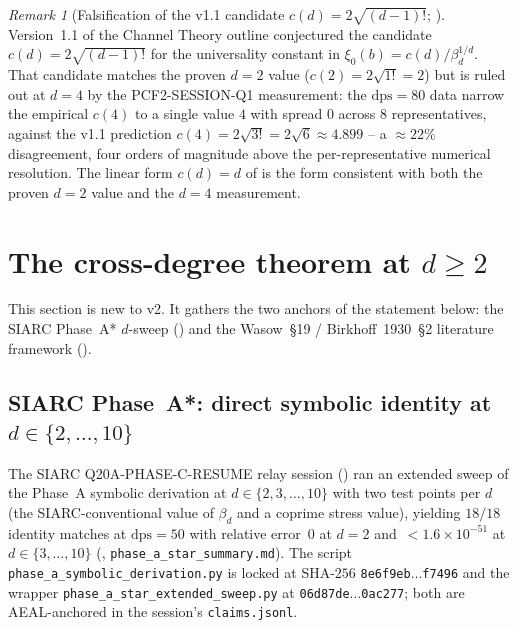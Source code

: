 \documentclass[11pt,reqno]{amsart}
\theoremstyle{plain}
\theoremstyle{definition}
\theoremstyle{remark}
\newtheorem{remark}[theorem]{Remark}
\newcommand{\dps}{\mathrm{dps}}
\begin{document}
\begin{remark}[Falsification of the v1.1 candidate
$c(d) = 2\sqrt{(d-1)!}$;
{\cite[Remark~3.3.E]{siarc_channel_theory_v13}}]
\label{rem:falsification}
Version~1.1 of the Channel Theory outline conjectured the
candidate $c(d) = 2\sqrt{(d-1)!}$ for the universality
constant in $\xi_0(b) = c(d) / \beta_d^{1/d}$. That
candidate matches the proven $d = 2$ value
($c(2) = 2\sqrt{1!} = 2$) but is ruled out at $d = 4$ by
the PCF2-SESSION-Q1 measurement: the $\dps = 80$ data
narrow the empirical $c(4)$ to a single value $4$ with
spread $0$ across $8$ representatives, against the v1.1
prediction $c(4) = 2\sqrt{3!} = 2\sqrt{6} \approx 4.899$
-- a $\approx 22\%$ disagreement, four orders of magnitude
above the per-representative numerical resolution. The
linear form $c(d) = d$ of  is the form
consistent with both the proven $d = 2$ value and the
$d = 4$ measurement.
\end{remark}

\section{The cross-degree theorem at \texorpdfstring{$d \ge 2$}{d>=2}}
\label{sec:cross-degree}

This section is new to v2. It gathers the two anchors of the
 statement below: the SIARC Phase~A*
$d$-sweep () and the Wasow~\S19 /
Birkhoff~1930~\S2 literature framework
().

\subsection{SIARC Phase~A*: direct symbolic identity at \texorpdfstring{$d \in \{2,\ldots,10\}$}{d in 2..10}}
\label{ssec:phase-a-star}

The SIARC Q20A-PHASE-C-RESUME relay session
(\cite{siarc_q20a_phase_c_resume}) ran an extended sweep of
the Phase~A symbolic derivation at $d \in \{2, 3, \ldots, 10\}$
with two test points per $d$ (the SIARC-conventional value of
$\beta_d$ and a coprime stress value), yielding $18/18$
identity matches at $\dps = 50$ with relative error~$0$ at
$d=2$ and~$<1.6\times 10^{-51}$ at $d \in \{3,\dots,10\}$
(\cite[Phase~A* summary]{siarc_q20a_phase_c_resume},
\texttt{phase\_a\_star\_summary.md}). The script
\texttt{phase\_a\_symbolic\_derivation.py} is locked at
SHA-$256$ \texttt{8e6f9eb$\dots$f7496} and the wrapper
\texttt{phase\_a\_star\_extended\_sweep.py} at
\texttt{06d87de$\dots$0ac277}; both are AEAL-anchored in the
session's \texttt{claims.jsonl}.
\end{document}
